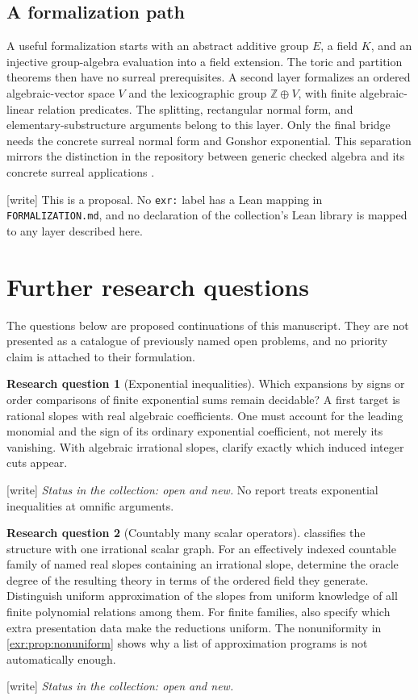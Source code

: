 \documentclass[11pt,letterpaper]{article}
\numberwithin{equation}{section}
\theoremstyle{definition}
\newtheorem{question}{Research question}
\theoremstyle{remark}
\newcommand{\Z}{\mathbb Z}
\newcommand{\rpath}[1]{\nolinkurl{#1}}%
\newcommand{\wtag}{\textup{[write]}}%
\begin{document}
\subsection{A formalization path}
A useful formalization starts with an abstract additive group $E$, a field $K$,
and an injective group-algebra evaluation into a field extension. The toric and
partition theorems then have no surreal prerequisites. A second layer formalizes
an ordered algebraic-vector space $V$ and the lexicographic group $\Z\oplus V$,
with finite algebraic-linear relation predicates. The splitting, rectangular
normal form, and elementary-substructure arguments belong to this layer.
Only the final bridge needs the concrete surreal normal form and Gonshor
exponential. This separation mirrors the distinction in the repository between
generic checked algebra and its concrete surreal applications
\cite{repo-catalogue,repo-exp}.

\wtag{} This is a proposal. No \texttt{exr:} label has a Lean mapping in
\rpath{FORMALIZATION.md}, and no declaration of the collection's Lean library
is mapped to any layer described here.

\section{Further research questions}\label{exr:sec:questions}
The questions below are proposed continuations of this manuscript. They are not
presented as a catalogue of previously named open problems, and no priority claim
is attached to their formulation.

\begin{question}[Exponential inequalities]\label{exr:q:inequality}
Which expansions by signs or order comparisons of finite exponential sums remain
decidable? A first target is rational slopes with real algebraic coefficients.
One must account for the leading monomial and the sign of its ordinary
exponential coefficient, not merely its vanishing. With algebraic irrational
slopes, clarify exactly which induced integer cuts appear.
\end{question}
\wtag{} \emph{Status in the collection: open and new.} No report
treats exponential inequalities at omnific arguments.


\begin{question}[Countably many scalar operators]\label{exr:q:scalars}
 classifies the structure with one irrational scalar graph.
For an effectively indexed countable family of named real slopes containing an
irrational slope, determine the oracle degree of the resulting theory in terms
of the ordered field they generate. Distinguish uniform approximation of the
slopes from uniform knowledge of all finite polynomial relations among them.
For finite families, also specify which extra presentation data make the
reductions uniform. The nonuniformity in \cref{exr:prop:nonuniform} shows why a list
of approximation programs is not automatically enough.
\end{question}
\wtag{} \emph{Status in the collection: open and new.}
\end{document}
